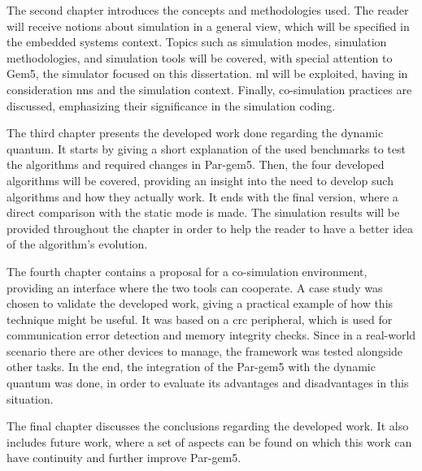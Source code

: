 The second chapter introduces the concepts and methodologies used. The reader will receive notions about simulation in a general view, which 
will be specified in the embedded systems context. Topics such as simulation modes, simulation methodologies, and simulation tools 
will be covered, with special attention to Gem5, the simulator focused on this dissertation. \gls{ml} will be exploited, having in 
consideration \glspl{nn} and the simulation context. Finally, co-simulation practices are discussed, emphasizing their significance in the 
simulation coding.

The third chapter presents the developed work done regarding the dynamic quantum. It starts by giving a short explanation of the used benchmarks
to test the algorithms and required changes in Par-gem5. Then, the four developed algorithms will be covered, providing an insight into the need to develop 
such algorithms and how they actually work. It ends with the final version, where a direct comparison with the static mode is made. The 
simulation results will be provided throughout the chapter in order to help the reader to have a better idea of the algorithm's evolution.

The fourth chapter contains a proposal for a co-simulation environment, providing an interface where the two tools can cooperate. 
A case study was chosen to validate the developed work, giving a practical example of how this technique might be useful. 
It was based on a \gls{crc} peripheral, which is used for communication error detection and memory integrity checks. 
Since in a real-world scenario there are other devices to manage, the framework was tested alongside other tasks. In the end, the integration
of the Par-gem5 with the dynamic quantum was done, in order to evaluate its advantages and disadvantages in this situation. 

The final chapter discusses the conclusions regarding the developed work. It also includes future work, where a set of aspects can be found on 
which this work can have continuity and further improve Par-gem5. 

